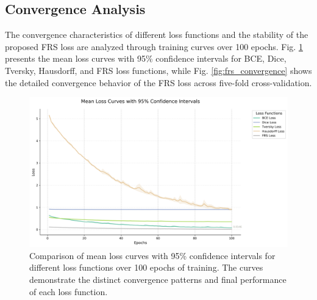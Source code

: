 \documentclass[review]{elsarticle}
\begin{document}
\subsection{Convergence Analysis}
The convergence characteristics of different loss functions and the stability of the proposed FRS loss are analyzed through training curves over 100 epochs. Fig. \ref{fig:all_losses} presents the mean loss curves with 95\% confidence intervals for BCE, Dice, Tversky, Hausdorff, and FRS loss functions, while Fig. \ref{fig:frs_convergence} shows the detailed convergence behavior of the FRS loss across five-fold cross-validation.
\begin{figure}[H]
    \centering
    \includegraphics[width=\textwidth]{loss_curves.png}
    \caption{Comparison of mean loss curves with 95\% confidence intervals for different loss functions over 100 epochs of training. The curves demonstrate the distinct convergence patterns and final performance of each loss function.}
    \label{fig:all_losses}
\end{figure}
\end{document}
